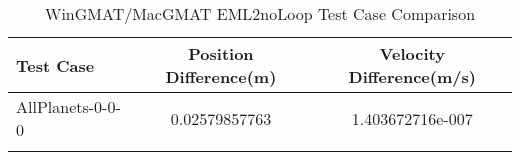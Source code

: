 \begin{table}[htbp!]
\centering
\caption{ WinGMAT/MacGMAT EML2noLoop Test Case Comparison}
      \begin{tabular}{lcc}
      \hline\hline
          Test Case & Position Difference(m) & Velocity Difference(m/s) \\
         \hline
         AllPlanets-0-0-0 & 0.02579857763 & 1.403672716e-007 \\
      \hline\hline
      \label{Table: EML2noLoop WinGMAT-MacGMAT Table} 
\end{tabular}
\end{table}
